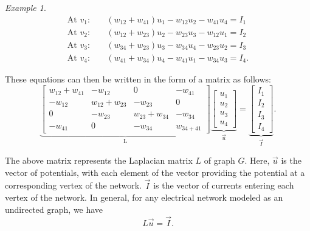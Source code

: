 \documentclass[%
 reprint,
 superscriptaddress,
 amsmath,amssymb,
 aps,
 pra,
floatfix,
nofootinbib,
]{revtex4-2}
\theoremstyle{definition}
\theoremstyle{remark}
\newtheorem{example}{Example}
\begin{document}
\begin{appendix}
\begin{example}
\begin{align}
\text{At } v_1:\quad & (w_{12} + w_{41})u_1 - w_{12}u_2 - w_{41}u_4 = I_1 \\
\text{At } v_2:\quad & (w_{12} + w_{23})u_2 - w_{23}u_3 - w_{12}u_1 = I_2 \\
\text{At } v_3:\quad & (w_{34} + w_{23})u_3 - w_{34}u_4 - w_{23}u_2 = I_3 \\
\text{At } v_4:\quad & (w_{41} + w_{34})u_4 - w_{41}u_1 - w_{34}u_3 = I_4. 
\end{align} 

These equations can then be written in the form of a matrix as follows:
\begin{equation} \label{eqn:laplacian}
\underbrace{ 
\begin{bmatrix}
     w_{12}+w_{41} & -w_{12} & 0 & -w_{41} \\
     -w_{12} & w_{12}+w_{23} & -w_{23} & 0 \\
     0 & -w_{23} & w_{23} + w_{34} & -w_{34} \\
     -w_{41} & 0 & -w_{34} & w_{34+41}
 \end{bmatrix} }_{\text{L}}
\underbrace{\begin{bmatrix}
        u_1 \\
        u_2 \\
        u_3 \\
        u_4
    \end{bmatrix}}_{\vec{u}}
    =  \underbrace{\begin{bmatrix}
        I_1 \\
        I_2 \\
        I_3 \\
        I_4
    \end{bmatrix}}_{\vec{I}}.
\end{equation}

The above matrix represents the Laplacian matrix $L$ of graph $G$. Here, $\vec{u}$ is the vector of potentials, with each element of the vector providing the potential at a corresponding vertex of the network. $\vec{I}$ is the vector of currents entering each vertex of the network. In general, for any electrical network modeled as an undirected graph, we have 
\begin{equation}
    L\vec{u} =\vec{I}.
\end{equation}


\end{example}
\end{appendix}
\end{document}
